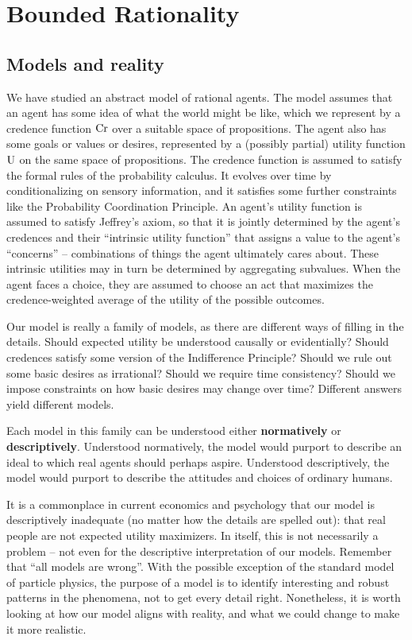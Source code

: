 \chapter{Bounded Rationality}


\section{Models and reality}

We have studied an abstract model of rational agents. The model assumes that an
agent has some idea of what the world might be like, which we represent by a
credence function $\text{Cr}$ over a suitable space of propositions. The agent also
has some goals or values or desires, represented by a (possibly partial) utility
function $\text{U}$ on the same space of propositions. The credence function is
assumed to satisfy the formal rules of the probability calculus. It evolves over
time by conditionalizing on sensory information, and it satisfies some further
constraints like the Probability Coordination Principle. An agent's utility
function is assumed to satisfy Jeffrey's axiom, so that it is jointly determined
by the agent's credences and their ``intrinsic utility function'' that assigns a
value to the agent's ``concerns'' -- combinations of things the agent ultimately
cares about. These intrinsic utilities may in turn be determined by aggregating
subvalues. When the agent faces a choice, they are assumed to choose an act that
maximizes the credence-weighted average of the utility of the possible outcomes.

Our model is really a family of models, as there are different ways of filling
in the details. Should expected utility be understood causally or evidentially?
Should credences satisfy some version of the Indifference Principle? Should we
rule out some basic desires as irrational? Should we require time consistency?
Should we impose constraints on how basic desires may change over time?
Different answers yield different models.

Each model in this family can be understood either \textbf{normatively} or
\textbf{descriptively}. Understood normatively, the model would purport to
describe an ideal to which real agents should perhaps aspire. Understood
descriptively, the model would purport to describe the attitudes and choices of
ordinary humans.

It is a commonplace in current economics and psychology that our model is
descriptively inadequate (no matter how the details are spelled out): that real
people are not expected utility maximizers. In itself, this is not necessarily a
problem -- not even for the descriptive interpretation of our models. Remember
that ``all models are wrong''. With the possible exception of the standard model
of particle physics, the purpose of a model is to identify interesting and
robust patterns in the phenomena, not to get every detail right. Nonetheless, it
is worth looking at how our model aligns with reality, and what we
could change to make it more realistic.

